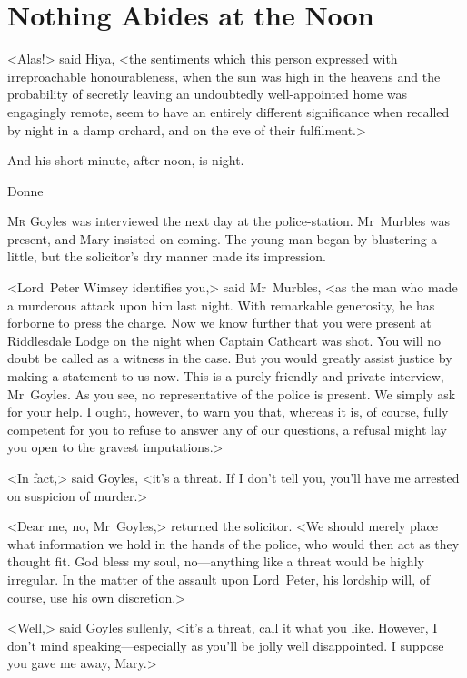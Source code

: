 

\chapter{Nothing Abides at the Noon}


\epigraph{<Alas!> said Hiya, <the sentiments which this person expressed with irreproachable honourableness, when the sun was high in the heavens and the probability of secretly leaving an undoubtedly well-appointed home was engagingly remote, seem to have an entirely different significance when recalled by night in a damp orchard, and on the eve of their fulfilment.>}{}

\epigraph{And his short minute, after noon, is night.}{Donne}



\lettrine{M}{r} Goyles was interviewed the next day at the police-station. Mr~Murbles was present, and Mary insisted on coming. The young man began by blustering a little, but the solicitor's dry manner made its impression.

<Lord~Peter Wimsey identifies you,> said Mr~Murbles, <as the man who made a murderous attack upon him last night. With remarkable generosity, he has forborne to press the charge. Now we know further that you were present at Riddlesdale Lodge on the night when Captain Cathcart was shot. You will no doubt be called as a witness in the case. But you would greatly assist justice by making a statement to us now. This is a purely friendly and private interview, Mr~Goyles.  As you see, no representative of the police is present. We simply ask for your help. I ought, however, to warn you that, whereas it is, of course, fully competent for you to refuse to answer any of our questions, a refusal might lay you open to the gravest imputations.>

<In fact,> said Goyles, <it's a threat. If I don't tell you, you'll have me arrested on suspicion of murder.>

<Dear me, no, Mr~Goyles,> returned the solicitor. <We should merely place what information we hold in the hands of the police, who would then act as they thought fit. God bless my soul, no—anything like a threat would be highly irregular. In the matter of the assault upon Lord~Peter, his lordship will, of course, use his own discretion.>

<Well,> said Goyles sullenly, <it's a threat, call it what you like.  However, I don't mind speaking—especially as you'll be jolly well disappointed. I suppose you gave me away, Mary.>

